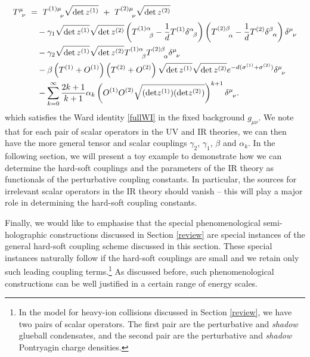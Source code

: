\documentclass[prd,reprint,a4paper,showpacs,superscriptaddress,11pt,onecolumn,nofootinbib]{revtex4-1}
\renewcommand{\(}{\left(}
\renewcommand{\)}{\right)}
\newcommand{\6}{\partial}
\begin{document}
\begin{align} \label{eqn:totalscalar+tensortmunu}
T^\mu_{\phantom{\mu}\nu} ~ &= ~ T^{(1)\mu}_{\phantom{(1)\mu}\nu}\sqrt{{\rm det}\, z^{(1)}} ~ + ~ T^{(2)\mu}_{\phantom{(1)\mu}\nu}\sqrt{{\rm det}\, z^{(2)}} \nonumber\\
&\quad- \gamma_1\sqrt{{\rm det}\, z^{(1)}}\sqrt{{\rm det}\, z^{(2)}} \left(T^{(1)\alpha}_{\phantom{(2)\mu}\beta} - \dfrac{1}{d} T^{(1)} \delta^\alpha_{\phantom{\mu}\beta}\right)\left(T^{(2)\beta}_{\phantom{(2)\mu}\alpha} - \dfrac{1}{d} T^{(2)} \delta^\beta_{\phantom{\mu}\alpha}\right)\delta^\mu_{\phantom{\mu}\nu} \nonumber\\
&\quad - \gamma_2\sqrt{{\rm det}\, z^{(1)}}\sqrt{{\rm det}\, z^{(2)}}T^{(1)\alpha}_{\phantom{(2)\mu}\beta}T^{(2)\beta}_{\phantom{(2)\mu}\alpha}\delta^\mu_{\phantom{\mu}\nu} \nonumber \\
&\quad - \beta \left( T^{(1)} +O^{(1)}\right)\left(T^{(2)} +O^{(2)}\right)\sqrt{{\rm det}\, z^{(1)}}\sqrt{{\rm det}\, z^{(2)}}e^{-d(\sigma^{(1)}+\sigma^{(2)})}\delta^\mu_{\phantom{\mu}\nu} \nonumber\\ &\quad
- \sum_{k= 0}^\infty\frac{2k+1}{k+1}\alpha_k \left(O^{(1)}O^{(2)}\sqrt{({\rm det}z^{(1)})({\rm det}z^{(2)})}\right)^{k+1}\delta^{\mu}_{\phantom{\mu}\nu}.
\end{align}
which satisfies the Ward identity \eqref{fullWI} in the fixed background $g_{\mu\nu}$. We note that for each pair of scalar operators in the UV and IR theories, we can then have the more general tensor and scalar couplings $\gamma_2$, $\gamma_1$, $\beta$ and $\alpha_k$. In the following section, we will present a toy example to demonstrate how we can determine the hard-soft couplings and the parameters of the IR theory as functionals of the perturbative coupling constants. In particular, the sources for irrelevant scalar operators in the IR theory should vanish -- this will play a major role in determining the hard-soft coupling constants. 

Finally, we would like to emphasise that the special phenomenological semi-holographic constructions \cite{Iancu:2014ava,Mukhopadhyay:2015smb,Mukhopadhyay:2016fkl} discussed in Section \ref{review} are special instances of the general hard-soft coupling scheme discussed in this section. These special instances naturally follow if the hard-soft couplings are small and we retain only such leading coupling terms.\footnote{In the model for heavy-ion collisions discussed in Section \ref{review}, we have two pairs of scalar operators. The first pair are the perturbative and \textit{shadow} glueball condensates, and the second pair are the perturbative and \textit{shadow} Pontryagin charge densities.} As discussed before, such phenomenological constructions can be well justified in a certain range of energy scales.
\end{document}
